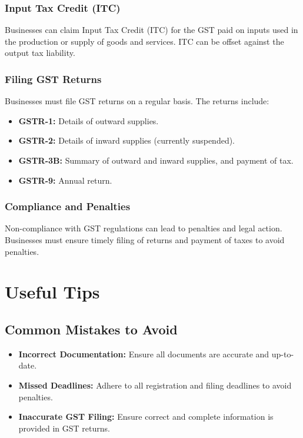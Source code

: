 \documentclass{article}
\begin{document}
\subsection{Input Tax Credit (ITC)}
Businesses can claim Input Tax Credit (ITC) for the GST paid on inputs used in the production or supply of goods and services. ITC can be offset against the output tax liability.

\subsection{Filing GST Returns}
Businesses must file GST returns on a regular basis. The returns include:
\begin{itemize}
    \item \textbf{GSTR-1:} Details of outward supplies.
    \item \textbf{GSTR-2:} Details of inward supplies (currently suspended).
    \item \textbf{GSTR-3B:} Summary of outward and inward supplies, and payment of tax.
    \item \textbf{GSTR-9:} Annual return.
\end{itemize}

\subsection{Compliance and Penalties}
Non-compliance with GST regulations can lead to penalties and legal action. Businesses must ensure timely filing of returns and payment of taxes to avoid penalties.

\chapter{Useful Tips}
\section{Common Mistakes to Avoid}
\begin{itemize}
    \item \textbf{Incorrect Documentation:} Ensure all documents are accurate and up-to-date.
    \item \textbf{Missed Deadlines:} Adhere to all registration and filing deadlines to avoid penalties.
    \item \textbf{Inaccurate GST Filing:} Ensure correct and complete information is provided in GST returns.
\end{itemize}
\end{document}
